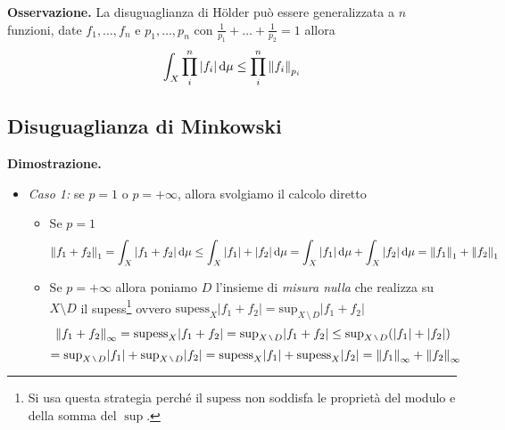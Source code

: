 \textbf{Osservazione.}
La disuguaglianza di H\"older può essere generalizzata a $n$ funzioni, date $f_1, \dots, f_n$ e $p_1, \dots, p_n$ con $\frac{1}{p_1} + \dots + \frac{1}{p_2} = 1$ allora
$$
\int_X \prod_i^n |f_i| \,\mathrm{d} \mu \leq \prod_i^n \left\lVert f_i \right\rVert_{p_i} 
$$

\subsection{Disuguaglianza di Minkowski}

%
\textbf{Dimostrazione.}
\begin{itemize}
	\item \textit{Caso 1:} se $p = 1$ o $p = +\infty$, allora svolgiamo il calcolo diretto
		
		\begin{itemize}
			\item Se $p = 1$
				$$
				\left\lVert f_1 + f_2 \right\rVert_1 
				= \int_X |f_1 + f_2| \,\mathrm{d} \mu 
				\leq \int_X |f_1| + |f_2| \,\mathrm{d} \mu 
				= \int_X |f_1| \,\mathrm{d} \mu + \int_X |f_2| \,\mathrm{d} \mu
				= \left\lVert f_1 \right\rVert_1 + \left\lVert f_2 \right\rVert_1
				$$
			\item Se $p = +\infty$ allora poniamo $D$ l'insieme di \textit{misura nulla} che realizza su $X \setminus D$ il supess\footnote{Si usa questa strategia perché il $\mathrm{supess}$ non soddisfa le proprietà del modulo e della somma del $\sup$.} ovvero $\mathrm{supess}_X |f_1 + f_2| = \mathrm{sup}_{X \,\setminus\, D} |f_1 + f_2|$
				$$
				\norm{f_1 + f_2}_\infty
				= \mathrm{supess}_X |f_1 + f_2| 
				= \mathrm{sup}_{X \,\setminus\, D} |f_1 + f_2| 
				\leq \mathrm{sup}_{X \,\setminus\, D} (|f_1| + |f_2|)
				$$
				$$
				= \mathrm{sup}_{X \,\setminus\, D} |f_1| + \mathrm{sup}_{X \,\setminus\, D} |f_2|
				= \mathrm{supess}_X |f_1| + \mathrm{supess}_X |f_2|
				= \norm{f_1}_\infty + \norm{f_2}_\infty
				$$
		\end{itemize}


\end{itemize}

